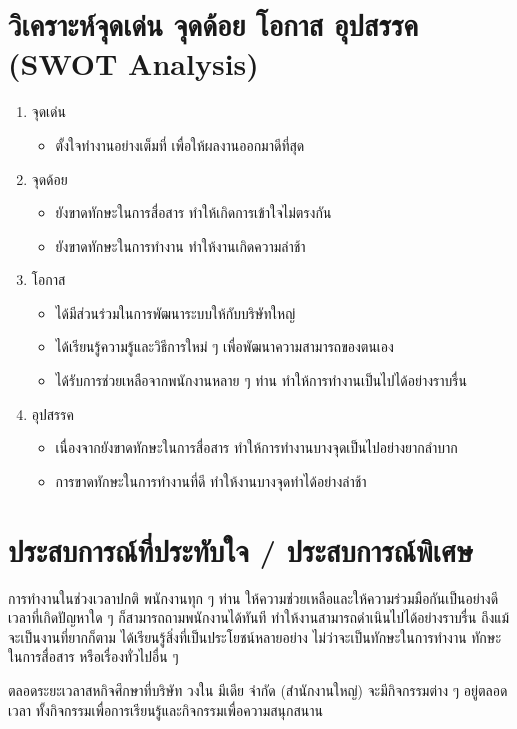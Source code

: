 \section{วิเคราะห์จุดเด่น จุดด้อย โอกาส อุปสรรค (SWOT Analysis)}
\begin{enumerate}
	\item จุดเด่น
	\begin{itemize}
		\item ตั้งใจทำงานอย่างเต็มที่ เพื่อให้ผลงานออกมาดีที่สุด
	\end{itemize}
	\item จุดด้อย
	\begin{itemize}
		\item ยังขาดทักษะในการสื่อสาร ทำให้เกิดการเข้าใจไม่ตรงกัน
		\item ยังขาดทักษะในการทำงาน ทำให้งานเกิดความล่าช้า
	\end{itemize}
	\item โอกาส
	\begin{itemize}
		\item ได้มีส่วนร่วมในการพัฒนาระบบให้กับบริษัทใหญ่
		\item ได้เรียนรู้ความรู้และวิธีการใหม่ ๆ เพื่อพัฒนาความสามารถของตนเอง
		\item ได้รับการช่วยเหลือจากพนักงานหลาย ๆ ท่าน ทำให้การทำงานเป็นไปได้อย่างราบรื่น
	\end{itemize}
	\item อุปสรรค
	\begin{itemize}
		\item เนื่องจากยังขาดทักษะในการสื่อสาร ทำให้การทำงานบางจุดเป็นไปอย่างยากลำบาก
		\item การขาดทักษะในการทำงานที่ดี ทำให้งานบางจุดทำได้อย่างล่าช้า
	\end{itemize}
\end{enumerate}

\section{ประสบการณ์ที่ประทับใจ / ประสบการณ์พิเศษ}
การทำงานในช่วงเวลาปกติ พนักงานทุก ๆ ท่าน ให้ความช่วยเหลือและให้ความร่วมมือกันเป็นอย่างดีเวลาที่เกิดปัญหาใด ๆ ก็สามารถถามพนักงานได้ทันที ทำให้งานสามารถดำเนินไปได้อย่างราบรื่น ถึงแม้จะเป็นงานที่ยากก็ตาม ได้เรียนรู้สิ่งที่เป็นประโยชน์หลายอย่าง ไม่ว่าจะเป็นทักษะในการทำงาน ทักษะในการสื่อสาร หรือเรื่องทั่วไปอื่น ๆ

ตลอดระยะเวลาสหกิจศึกษาที่บริษัท วงใน มีเดีย จำกัด (สำนักงานใหญ่) จะมีกิจกรรมต่าง ๆ อยู่ตลอดเวลา ทั้งกิจกรรมเพื่อการเรียนรู้และกิจกรรมเพื่อความสนุกสนาน
